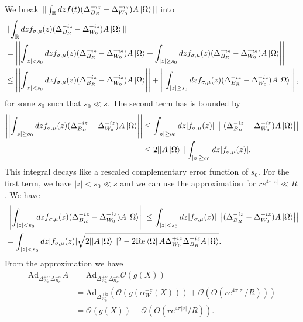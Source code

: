 \documentclass[a4paper,11pt]{article}
\theoremstyle{definition}
\newcommand{\nn}{\nonumber}
\begin{document}
We break $||\int_\mathbb{R} dz f(t)(\Delta_{B_R}^{-iz} - \Delta_{W_0}^{-iz})A\ket{\Omega}||$ into
\begin{align}
    &||\int_\mathbb{R} dz f_{\sigma,\mu}(z)(\Delta_{B_R}^{-iz} - \Delta_{W_0}^{-iz})A\ket{\Omega}|| \nn\\
    &=\left|\left|\int_{|z|<s_0} dz f_{\sigma,\mu}(z) (\Delta_{B_R}^{-iz} - \Delta_{W_0}^{-iz})A\ket{\Omega}+\int_{|z|\geq s_0} dz f_{\sigma,\mu}(z)(\Delta_{B_R}^{-iz} - \Delta_{W_0}^{-iz})A\ket{\Omega}\right|\right|\\
    & \leq \left|\left|\int_{|z|<s_0} dz f_{\sigma,\mu}(z) (\Delta_{B_R}^{-iz} - \Delta_{W_0}^{-iz})A\ket{\Omega}\right|\right| + \left|\left| \int_{|z|\geq s_0} dz f_{\sigma,\mu}(z)(\Delta_{B_R}^{-iz} - \Delta_{W_0}^{-iz})A\ket{\Omega}\right|\right|,
\end{align}
for some $s_0$ such that $s_0\ll s$. The second term has is bounded by
\begin{align}
    \left|\left|\int_{|z|\geq s_0} dz f_{\sigma,\mu}(z)(\Delta_{B_R}^{-iz} - \Delta_{W_0}^{-iz})A\ket{\Omega}\right|\right| &\leq \int_{|z|\geq s_0} dz |f_{\sigma,\mu}(z)|\;\left|\left|(\Delta_{B_R}^{-iz} - \Delta_{W_0}^{-iz})A\ket{\Omega}\right|\right|\\
    &\leq 2||A\ket{\Omega}|| \int_{|z|\geq s_0} dz |f_{\sigma,\mu}(z)| .
\end{align}
This integral decays like a rescaled complementary error function of $s_0$. For the first term, we have $|z|< s_0\ll s$ and we can use the approximation for $re^{4\pi|z|}\ll R$. We have
\begin{align}
    &\left|\left|\int_{|z|<s_0} dz f_{\sigma,\mu}(z) (\Delta_{B_R}^{-iz} - \Delta_{W_0}^{-iz})A\ket{\Omega}\right|\right| \leq \int_{|z|<s_0} dz |f_{\sigma,\mu}(z)| \left|\left|(\Delta_{B_R}^{-iz} - \Delta_{W_0}^{-iz})A\ket{\Omega}\right|\right| \\
    &= \int_{|z|<s_0} dz |f_{\sigma,\mu}(z)| \sqrt{2||A\ket{\Omega}||^2 - 2\text{Re}\bra{\Omega}A \Delta_{W_0}^{+iz}\Delta_{B_R}^{-iz} A\ket{\Omega}}.
\end{align}
From the approximation we have
\begin{align}
    \text{Ad}_{\Delta_{W_0}^{+iz}\Delta_{B_R}^{-iz}} A &= \text{Ad}_{\Delta_{W_0}^{+iz}\Delta_{B_R}^{-iz}} \mathcal{O}(g(X))\\
    & = \text{Ad}_{\Delta_{W_0}^{+iz}} \left(\mathcal{O}(g(\alpha_{W}^{-z}(X))) + \mathcal{O}(O(re^{4\pi|z|}/R))\right)\\
    & = \mathcal{O}(g(X)) + \mathcal{O}(O(re^{4\pi|z|}/R)).
\end{align}
\end{document}
